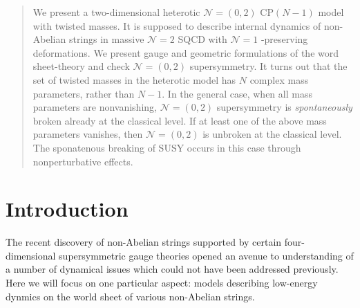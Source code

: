 \documentclass[12pt]{article}
\newcommand{\ntwo}{${\mathcal N}=2$ }
\newcommand{\ntwot}{${\mathcal N}= \left(2,2\right) $ }
\newcommand{\ntwoo}{${\mathcal N}= \left(0,2\right) $ }
\newcommand{\none}{${\mathcal N}=1$ }
\begin{document}
\begin{titlepage}
\begin{abstract}
We present a two-dimensional heterotic \ntwoo CP$(N-1)$ model
with twisted masses. It is supposed to describe internal dynamics of non-Abelian strings 
in massive \ntwo SQCD with
\none-preserving deformations. We present gauge and geometric
formulations of the word sheet-theory and check \ntwoo 
supersymmetry. 
It turns out that the set of twisted masses
 in the heterotic model  has $N$ complex mass parameters, rather than $N-1$.
 In the general case, when all mass parameters are nonvanishing, \ntwoo
 supersymmetry is {\em spontaneously} broken already at the classical level.
 If at least one of the above mass parameters vanishes, then \ntwoo is unbroken at the classical level.
 The sponatenous breaking of SUSY occurs in this case  through nonperturbative effects.



 

\end{abstract}

\end{titlepage}

\section{Introduction}

The recent discovery of non-Abelian strings 
\cite{HT1,ABEKY,SYmon,HT2}
supported by certain four-dimensional supersymmetric gauge theories 
opened an avenue to understanding of a number of dynamical issues which could not have been addressed
previously. Here we will focus on one particular aspect: models describing low-energy dynmics
on the world sheet of various non-Abelian strings.
\end{document}
